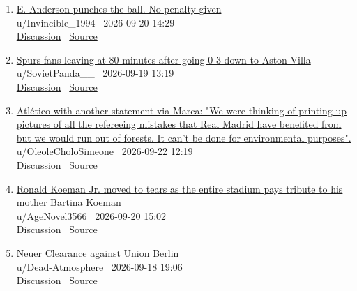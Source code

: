\documentclass[11pt,a4paper]{article}
\begin{document}
\begin{enumerate}
  \item \href{https://www.reddit.com/r/soccer/comments/1wlikdp/e_anderson_punches_the_ball_no_penalty_given/}{E. Anderson punches the ball. No penalty given}\\ {\small u/Invincible\_1994 \textbullet\ 2026-09-20 14:29}\\ {\small \href{https://www.reddit.com/r/soccer/comments/1wlikdp/e_anderson_punches_the_ball_no_penalty_given/}{Discussion} \textbullet\ \href{https://v.redd.it/iom87qysqoqh1}{Source}}
  \item \href{https://www.reddit.com/r/soccer/comments/1wkm2x1/spurs_fans_leaving_at_80_minutes_after_going_03/}{Spurs fans leaving at 80 minutes after going 0-3 down to Aston Villa}\\ {\small u/SovietPanda\_\_ \textbullet\ 2026-09-19 13:19}\\ {\small \href{https://www.reddit.com/r/soccer/comments/1wkm2x1/spurs_fans_leaving_at_80_minutes_after_going_03/}{Discussion} \textbullet\ \href{https://i.redd.it/hsd5pe8j9hqh1.png}{Source}}
  \item \href{https://www.reddit.com/r/soccer/comments/1wn7xr9/atlético_with_another_statement_via_marca_we_were/}{Atlético with another statement via Marca: "We were thinking of printing up pictures of all the refereeing mistakes that Real Madrid have benefited from but we would run out of forests. It can't be done for environmental purposes".}\\ {\small u/OleoleCholoSimeone \textbullet\ 2026-09-22 12:19}\\ {\small \href{https://www.reddit.com/r/soccer/comments/1wn7xr9/atlético_with_another_statement_via_marca_we_were/}{Discussion} \textbullet\ \href{https://www.marca.com/futbol/atletico/2026/09/21/atletico-da-credito-hay-lineas-rojas-traspasar-han-vuelto.html}{Source}}
  \item \href{https://www.reddit.com/r/soccer/comments/1wljdki/ronald_koeman_jr_moved_to_tears_as_the_entire/}{Ronald Koeman Jr. moved to tears as the entire stadium pays tribute to his mother Bartina Koeman}\\ {\small u/AgeNovel3566 \textbullet\ 2026-09-20 15:02}\\ {\small \href{https://www.reddit.com/r/soccer/comments/1wljdki/ronald_koeman_jr_moved_to_tears_as_the_entire/}{Discussion} \textbullet\ \href{https://v.redd.it/f0tkkjaxwoqh1}{Source}}
  \item \href{https://www.reddit.com/r/soccer/comments/1wjzaah/neuer_clearance_against_union_berlin/}{Neuer Clearance against Union Berlin}\\ {\small u/Dead-Atmosphere \textbullet\ 2026-09-18 19:06}\\ {\small \href{https://www.reddit.com/r/soccer/comments/1wjzaah/neuer_clearance_against_union_berlin/}{Discussion} \textbullet\ \href{https://v.redd.it/athb20ehubqh1}{Source}}

\end{enumerate}
\end{document}
